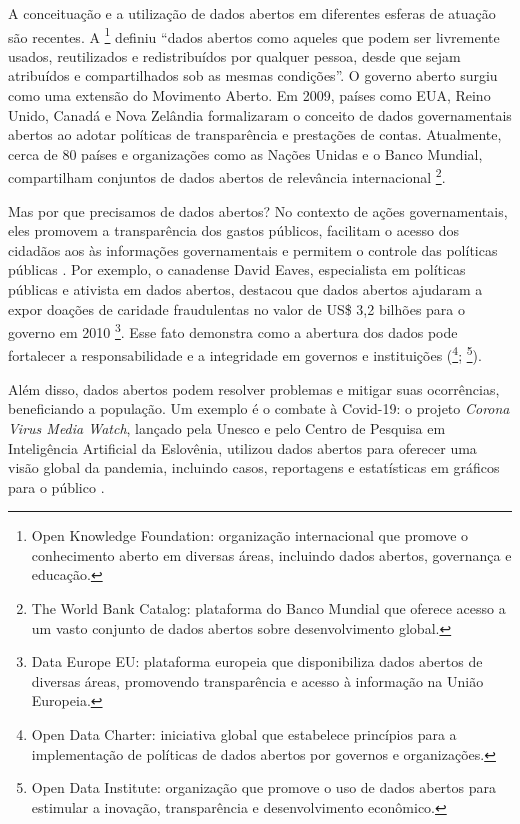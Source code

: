 \documentclass[portuguese]{textolivre}
\begin{document}
A conceituação e a utilização de dados abertos em diferentes esferas de atuação são recentes. A \textcite[tradução nossa]{open_knowledge_foundation2005} \footnote{Open Knowledge Foundation: organização internacional que promove o conhecimento aberto em diversas áreas, incluindo dados abertos, governança e educação.} definiu “dados abertos como aqueles que podem ser livremente usados, reutilizados e redistribuídos por qualquer pessoa, desde que sejam atribuídos e compartilhados sob as mesmas condições”. O governo aberto surgiu como uma extensão do Movimento Aberto. Em 2009, países como EUA, Reino Unido, Canadá e Nova Zelândia formalizaram o conceito de dados governamentais abertos ao adotar políticas de transparência e prestações de contas. Atualmente, cerca de 80 países e organizações como as Nações Unidas e o Banco Mundial, compartilham conjuntos de dados abertos de relevância internacional \cite{world_bank_data_catalog2018}\footnote{The World Bank Catalog: plataforma do Banco Mundial que oferece acesso a um vasto conjunto de dados abertos sobre desenvolvimento global.}.

Mas por que precisamos de dados abertos? No contexto de ações governamentais, eles promovem a transparência dos gastos públicos, facilitam o acesso dos cidadãos aos às informações governamentais e permitem o controle das políticas públicas \cite{portal_brasileiro_dados_abertos2012}. Por exemplo, o canadense  David Eaves, especialista em políticas públicas e ativista em dados abertos, destacou que dados abertos ajudaram a expor doações de caridade fraudulentas no valor de US\$ 3,2 bilhões para o governo em 2010 \cite{dataeu2021}\footnote{Data Europe EU: plataforma europeia que disponibiliza dados abertos de diversas áreas, promovendo transparência e acesso à informação na União Europeia.}. Esse fato demonstra como a abertura dos dados pode fortalecer a responsabilidade e a integridade em governos e instituições (\textcite{open_data_charter2015}\footnote{Open Data Charter: iniciativa global que estabelece princípios para a implementação de políticas de dados abertos por governos e organizações.}; \textcite{open_data_institute2017}\footnote{Open Data Institute: organização que promove o uso de dados abertos para estimular a inovação, transparência e desenvolvimento econômico.}). 

Além disso, dados abertos podem resolver problemas e mitigar suas ocorrências, beneficiando a população. Um exemplo é o combate à Covid-19: o projeto \textit{Corona Virus Media Watch}, lançado pela Unesco e pelo Centro de Pesquisa em Inteligência Artificial da Eslovênia, utilizou dados abertos para oferecer uma visão global da pandemia, incluindo casos, reportagens e estatísticas em gráficos para o público \cite{unesco2020}. 
\end{document}

